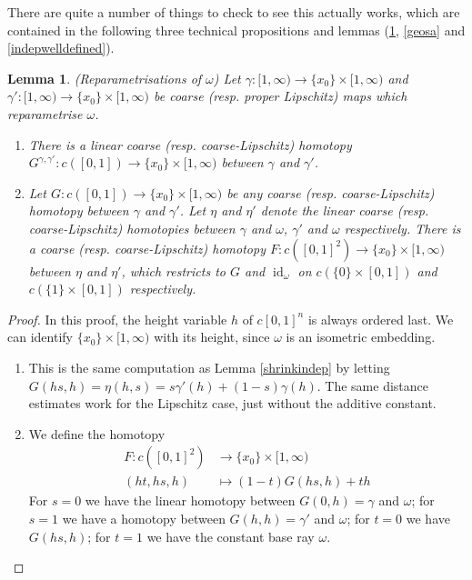 \documentclass[a4paper,11pt]{article}
\theoremstyle{definition}
\theoremstyle{plain}
\newtheorem{lemma}[definition]{Lemma}
\theoremstyle{remark}
\DeclareMathOperator{\id}{id}
\begin{document}
{There are quite a number of things to check to see this actually works, which are contained in the following three technical propositions and lemmas (\ref{baserayindep}, \ref{geosa} and \ref{indepwelldefined}).



\begin{lemma} \label{baserayindep} (Reparametrisations of $\omega$) Let $\gamma: [1,\infty)\rightarrow \{x_0\}\times [1,\infty)$ and $\gamma': [1,\infty)\rightarrow \{x_0\} \times [1,\infty)$ be coarse (resp. proper Lipschitz) maps which reparametrise $\omega$. 
\begin{enumerate}
\item There is a linear coarse (resp. coarse-Lipschitz) homotopy $G^{\gamma,\gamma'}: c([0,1])\rightarrow \{x_0\} \times [1,\infty)$ between $\gamma$ and $\gamma'$. 
\item Let $G:c([0,1])\rightarrow  \{x_0\} \times [1,\infty)$ be any coarse (resp. coarse-Lipschitz) homotopy between $\gamma$ and $\gamma'$. Let $\eta$ and $\eta'$ denote the linear coarse (resp. coarse-Lipschitz) homotopies between $\gamma$ and $\omega$, $\gamma'$ and $\omega$ respectively. There is a coarse (resp. coarse-Lipschitz) homotopy $F: c([0,1]^2)\rightarrow \{x_0\} \times [1,\infty)$ between $\eta$ and $\eta'$, which restricts to $G$ and $\id_{\omega}$ on  $c(\{0\} \times [0,1])$ and $c(\{1\} \times [0,1])$ respectively. 
\end{enumerate} 
\end{lemma}

\begin{proof}
In this proof, the height variable $h$ of $c[0,1]^n$ is always ordered last. We can identify $\{x_0\} \times [1,\infty)$ with its height, since $\omega$ is an isometric embedding. 
\begin{enumerate}
\item This is the same computation as Lemma \ref{shrinkindep} by letting $G(hs,h)=\eta(h,s) = s\gamma'(h) + (1-s)\gamma(h)$. The same distance estimates work for the Lipschitz case, just without the additive constant.  
\item We define the homotopy
\begin{align*}
F: c([0,1]^2)&\longrightarrow \{x_0\} \times [1,\infty)\\
(ht,hs,h)&\longmapsto (1-t) G(hs,h) + th
\end{align*}
For $s=0$ we have the linear homotopy between $G(0,h) = \gamma$ and $\omega$; for $s=1$ we have a homotopy between $G(h,h) = \gamma'$ and $\omega$; for $t=0$ we have $G(hs,h)$; for $t=1$ we have the constant base ray $\omega$. \\


\end{enumerate}
\end{proof}}
\end{document}
